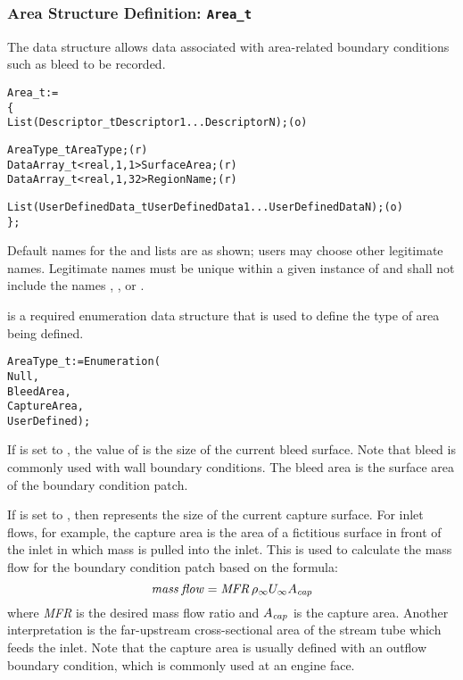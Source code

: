 \subsubsection{Area Structure Definition: \texttt{Area\_t}}
\label{s:Area}

The  data structure allows data associated with
area-related boundary conditions such as bleed to be recorded.

\begin{alltt}
  Area\_t :=
    \{
    List( Descriptor\_t  Descriptor1 ... DescriptorN ) ;                     (o)

    AreaType\_t AreaType ;                                                   (r)
    DataArray\_t<real, 1, 1>  SurfaceArea ;                                  (r)
    DataArray\_t<real, 1, 32> RegionName ;                                   (r)

    List( UserDefinedData\_t UserDefinedData1 ... UserDefinedDataN ) ;       (o)
    \} ;
\end{alltt}

\begin{notes}
\item
 Default names for the  and 
 lists are as shown; users may choose other legitimate names.
 Legitimate names must be unique within a given instance of
  and shall not include the names ,
 , or .
\end{notes}

 is a required enumeration data structure
that is used to define the type of area being defined.
\begin{alltt}
  AreaType\_t := Enumeration(
    Null,
    BleedArea,
    CaptureArea,
    UserDefined ) ;
\end{alltt}

If  is set to , the value of
 is the size of the current bleed surface.
Note that bleed is commonly used with wall boundary conditions.
The bleed area is the surface area of the boundary condition patch.

If  is set to , then
 represents the size of the current capture surface.
For inlet flows, for example, the capture area is the area of a
fictitious surface in front of the inlet in which mass is pulled into
the inlet.
This is used to calculate the mass flow for the boundary condition patch
based on the formula:
$$
{\it mass\:flow} = {\it MFR} \, \rho_{\infty} U_{\infty} A_{\it cap}
$$
where \textit{MFR} is the desired mass flow ratio and
$A_{\it cap}$ is the capture area.
Another interpretation is the far-upstream cross-sectional area of the
stream tube which feeds the inlet.
Note that the capture area is usually defined with an outflow boundary
condition, which is commonly used at an engine face.

